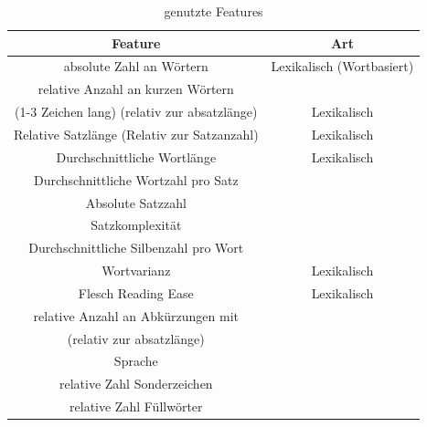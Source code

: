 \documentclass[conference]{IEEEtran}
\begin{document}
	\begin{table}[htbp]
		\caption{genutzte Features}
		\begin{center}
			\begin{tabular}{|c|c|}
				\hline
				\textbf{Feature} & \textbf{Art} \\
				\hline 
				absolute Zahl an Wörtern & Lexikalisch (Wortbasiert) \\
				\hline
				relative Anzahl an kurzen Wörtern \\ (1-3 Zeichen lang) (relativ zur absatzlänge) & Lexikalisch \\
				\hline 
				Relative Satzlänge (Relativ zur Satzanzahl) & Lexikalisch \\
				\hline
				Durchschnittliche Wortlänge & Lexikalisch \\
				\hline
				Durchschnittliche Wortzahl pro Satz & \\
				\hline
				Absolute Satzzahl & \\
				\hline
				Satzkomplexität & \\
				\hline
				Durchschnittliche Silbenzahl pro Wort & \\
				\hline
				Wortvarianz & Lexikalisch \\
				\hline
				Flesch Reading Ease & Lexikalisch \\
				\hline
				relative Anzahl an Abkürzungen mit \grq \\(relativ zur absatzlänge) & \\
				\hline 
				Sprache \cite{mf_b6} & \\
				\hline
				relative Zahl Sonderzeichen & \\
				\hline
				relative Zahl Füllwörter & \\
				\hline
			\end{tabular}
			\label{tab:features}
		\end{center}
	\end{table}
\end{document}
